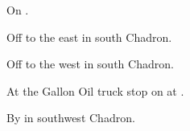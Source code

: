 
\begin{LocationList}

On  .

Off  to the east in south Chadron.

\Location{\TruckService \Service}
Off  to the west in south Chadron.

At the Gallon Oil truck stop on  at .

By   in southwest Chadron.

\end{LocationList}
